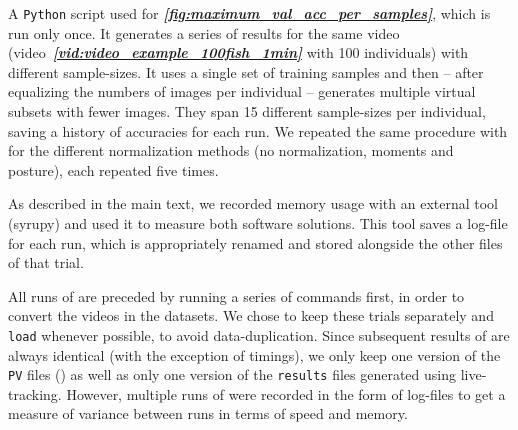 \documentclass[9pt,lineno]{elife}
\newcommand{\figref}[1]{\textit{\textbf{\ref{#1}}}}
\newcommand{\videoref}[1]{video~\textit{\textbf{\ref{#1}}}}
\newcommand{\TRex}{\protect\path{TRex}}
\newcommand{\TGrabs}{\protect\path{TGrabs}}
\begin{document}
\begin{appendixbox}
A \texttt{Python} script used for \figref{fig:maximum_val_acc_per_samples}, which is run only once. It generates a series of results for the same video (\videoref{vid:video_example_100fish_1min} with 100 individuals) with different sample-sizes. It uses a single set of training samples and then -- after equalizing the numbers of images per individual -- generates multiple virtual subsets with fewer images. They span 15 different sample-sizes per individual, saving a history of accuracies for each run. We repeated the same procedure with for the different normalization methods (no normalization, moments and posture), each repeated five times.



As described in the main text, we recorded memory usage with an external tool (syrupy) and used it to measure both software solutions. This tool saves a log-file for each run, which is appropriately renamed and stored alongside the other files of that trial.

All runs of \TRex{} are preceded by running a series of \TGrabs{} commands first, in order to convert the videos in the datasets. We chose to keep these trials separately and \texttt{load} whenever possible, to avoid data-duplication. Since subsequent results of \TGrabs{} are always identical (with the exception of timings), we only keep one version of the \texttt{PV} files () as well as only one version of the \texttt{results} files generated using live-tracking. However, multiple runs of \TGrabs{} were recorded in the form of log-files to get a measure of variance between runs in terms of speed and memory.


\end{appendixbox}
\end{document}
